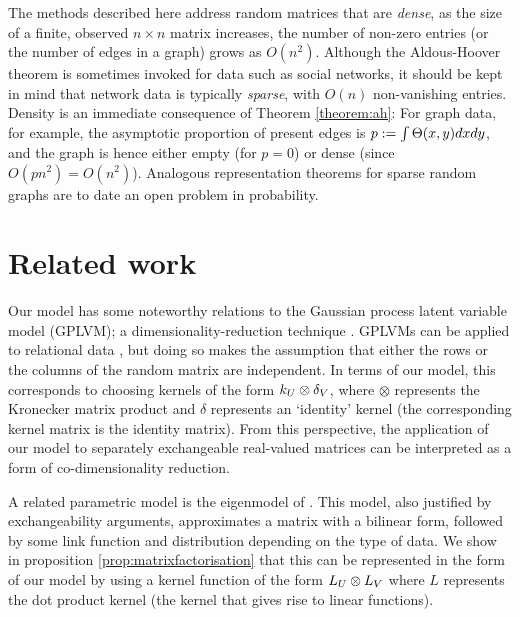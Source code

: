 \begin{rem}
  The methods described here address random matrices that are \emph{dense}, \ie as the size of a finite, observed $n\times n$ matrix increases,
  the number of non-zero entries (or the number of edges in a graph) grows as $O(n^2)$. Although the Aldous-Hoover theorem is sometimes invoked
  for data such as social networks, it should be kept in mind that network data is typically \emph{sparse}, with $O(n)$ non-vanishing entries.
  Density is an immediate consequence of Theorem \ref{theorem:ah}: For graph data, for example, the asymptotic proportion of present edges is
  ${p:=\int\Theta(x,y)dxdy}$, and the graph is hence either empty (for $p=0$) or dense (since
  $O(pn^2)=O(n^2)$). Analogous representation theorems for sparse random graphs are to date an open problem in probability.
\end{rem}

\section{Related work}
\label{sec:networks:related}

Our model has some noteworthy relations to the Gaussian process latent variable model (GPLVM); a dimensionality-reduction technique \citep[e.g.][]{Lawrence2005-cn}.
GPLVMs can be applied to relational data \citep{Lawrence2009-za}, but doing so makes the assumption that either the rows or the columns of the random matrix are independent. 
In terms of our model, this corresponds to choosing kernels of the form $k_U \otimes \delta_V$, where $\otimes$ represents the Kronecker matrix product and $\delta$ represents an `identity' kernel (\ie the corresponding kernel matrix is the identity matrix).
From this perspective, the application of our model to separately exchangeable real-valued matrices can be interpreted as a form of co-dimensionality reduction. 

A related parametric model is the eigenmodel of \citet{Hoff2007-ja}.
This model, also justified by exchangeability arguments, approximates a matrix with a bilinear form, followed by some link function and distribution depending on the type of data.
We show in proposition \ref{prop:matrixfactorisation} that this can be represented in the form of our model by using a kernel function of the form $L_U \otimes L_V$ where $L$ represents the dot product kernel (\ie the kernel that gives rise to linear functions).

